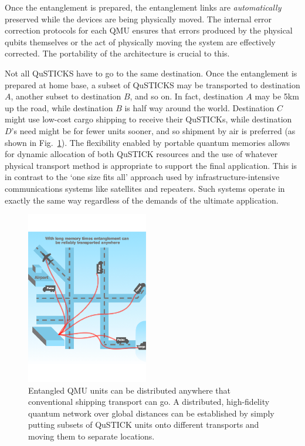 \documentclass[twocolumn, aps, rmp, amsmath, amssymb, nofootinbib, superscriptaddress, longbibliography, floatfix, table-of-contents, eqsecnum]{revtex4-2}
\begin{document}
Once the entanglement is prepared, the entanglement links are \textit{automatically} preserved while the devices are being physically moved. The internal error correction protocols for each QMU ensures that errors produced by the physical qubits themselves or the act of physically moving the system are effectively corrected. The portability of the architecture is crucial to this. 

Not all QuSTICKS have to go to the same destination. Once the entanglement is prepared at home base, a subset of QuSTICKS may be transported to destination $A$, another subset to destination $B$, and so on. In fact, destination $A$ may be 5km up the road, while destination $B$ is half way around the world. Destination $C$ might use low-cost cargo shipping to receive their QuSTICKs, while destination $D$'s need might be for fewer units sooner, and so shipment by air is preferred (as shown in Fig.~\ref{fig:distribution}). The flexibility enabled by portable quantum memories allows for dynamic allocation of both QuSTICK resources and the use of whatever physical transport method is appropriate to support the final application. This is in contrast to the `one size fits all' approach used by infrastructure-intensive communications systems like satellites and repeaters. Such systems operate in exactly the same way regardless of the demands of the ultimate application.

\begin{figure}[htbp!]
	\includegraphics[clip=true, width=0.475\textwidth]{qustick3}
	\caption{Entangled QMU units can be distributed anywhere that conventional shipping transport can go.  A distributed, high-fidelity quantum network over global distances can be established by simply putting subsets of QuSTICK units onto different transports and moving them to separate locations.} \label{fig:distribution}
\end{figure}
\end{document}
